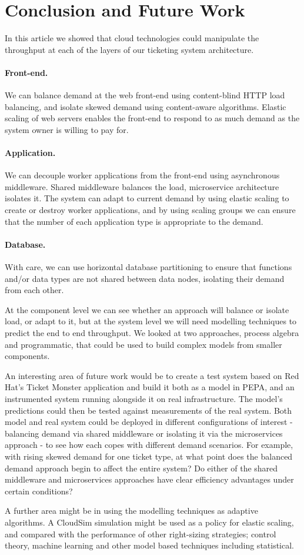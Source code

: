 \section{Conclusion and Future Work}
In this article we showed that cloud technologies could manipulate the throughput at each of the layers of our ticketing system architecture.
\paragraph{Front-end.}  We can balance demand at the web front-end using content-blind HTTP load balancing, and isolate skewed demand using content-aware algorithms.  Elastic scaling of web servers enables the front-end to respond to as much demand as the system owner is willing to pay for.
\paragraph{Application.} We can decouple worker applications from the front-end using asynchronous middleware.  Shared middleware balances the load, microservice architecture isolates it.  The system can adapt to current demand by using elastic scaling to create or destroy worker applications, and by using scaling groups we can ensure that the number of each application type is appropriate to the demand.
\paragraph{Database.} With care, we can use horizontal database partitioning to ensure that functions and/or data types are not shared between data nodes, isolating their demand from each other.

At the component level we can see whether an approach will balance or isolate load, or adapt to it, but at the system level we will need modelling techniques to predict the end to end throughput.  We looked at two approaches, process algebra and programmatic, that could be used to build complex models from smaller components.

An interesting area of future work would be to create a test system based on Red Hat's Ticket Monster application \cite{redhatticketmonster} and build it both as a model in PEPA, and an instrumented system running alongside it on real infrastructure. The model's predictions could then be tested against measurements of the real system.  Both model and real system could be deployed in different configurations of interest - balancing demand via shared middleware or isolating it via the microservices approach - to see how each copes with different demand scenarios.  For example, with rising skewed demand for one ticket type, at what point does the balanced demand approach begin to affect the entire system?  Do either of the shared middleware and microservices approaches have clear efficiency advantages under certain conditions?

A further area might be in using the modelling techniques as adaptive algorithms.  A CloudSim simulation might be used as a policy for elastic scaling, and compared with the performance of other right-sizing strategies; control theory, machine learning and other model based techniques including statistical.